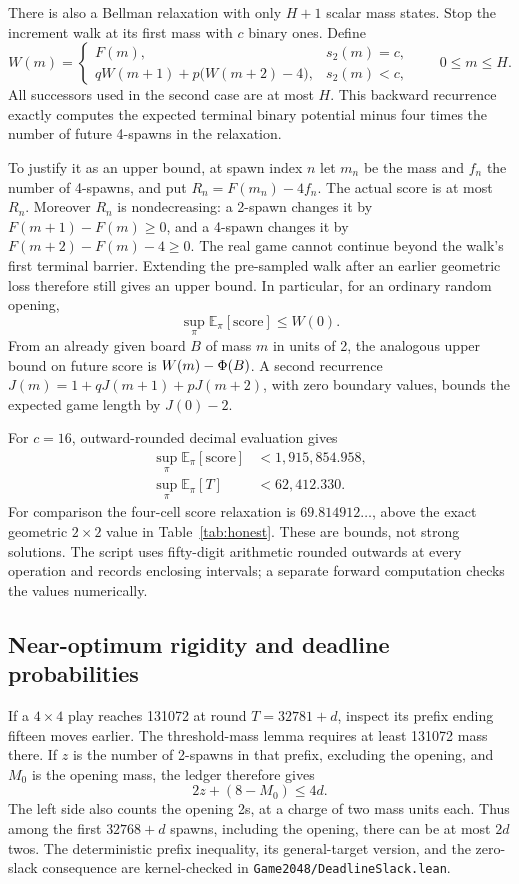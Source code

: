 There is also a Bellman relaxation with only $H+1$ scalar mass states.
Stop the increment walk at its first mass with $c$ binary ones. Define
\[
W(m)=
\begin{cases}
F(m),&s_2(m)=c,\\
qW(m+1)+p\bigl(W(m+2)-4\bigr),&s_2(m)<c,
\end{cases}
\qquad 0\le m\le H.
\]
All successors used in the second case are at most $H$. This backward
recurrence exactly computes the expected terminal binary potential minus
four times the number of future 4-spawns in the relaxation.

To justify it as an upper bound, at spawn index $n$ let $m_n$ be the
mass and $f_n$ the number of 4-spawns, and put $R_n=F(m_n)-4f_n$.
The actual score is at most $R_n$. Moreover $R_n$ is nondecreasing:
a 2-spawn changes it by $F(m+1)-F(m)\ge0$, and a 4-spawn changes it by
$F(m+2)-F(m)-4\ge0$. The real game cannot continue beyond the walk's
first terminal barrier. Extending the pre-sampled walk after an earlier
geometric loss therefore still gives an upper bound. In particular,
for an ordinary random opening,
\[
\sup_\pi\mathbb E_\pi[\mathrm{score}]\le W(0).
\]
From an already given board $B$ of mass $m$ in units of 2, the analogous
upper bound on future score is $W(m)-\Phi(B)$.
A second recurrence $J(m)=1+qJ(m+1)+pJ(m+2)$, with zero boundary values,
bounds the expected game length by $J(0)-2$.

For $c=16$, outward-rounded decimal evaluation gives
\begin{align*}
\sup_\pi\mathbb E_\pi[\mathrm{score}]&<1{,}915{,}854.958,\\
\sup_\pi\mathbb E_\pi[T]&<62{,}412.330.
\end{align*}
For comparison the four-cell score relaxation is $69.814912\ldots$,
above the exact geometric $2\times2$ value in Table~\ref{tab:honest}.
These are bounds, not strong solutions. The script
 uses fifty-digit arithmetic rounded
outwards at every operation and records enclosing intervals; a separate
forward computation checks the values numerically.

\subsection{Near-optimum rigidity and deadline probabilities}
\label{sec:slack}

If a $4\times4$ play reaches 131072 at round $T=32781+d$, inspect its
prefix ending fifteen moves earlier. The threshold-mass lemma requires
at least 131072 mass there. If $z$ is the number of 2-spawns in that
prefix, excluding the opening, and $M_0$ is the opening mass, the ledger
therefore gives
\[
2z+(8-M_0)\le4d.
\]
The left side also counts the opening 2s, at a charge of two mass units
each. Thus among the first $32768+d$ spawns, including the opening,
there can be at most $2d$ twos. The deterministic prefix inequality,
its general-target version, and the zero-slack consequence are
kernel-checked in \texttt{Game2048/DeadlineSlack.lean}.


